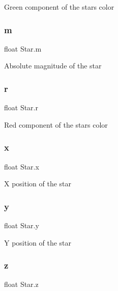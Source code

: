 Green component of the star\textquotesingle{}s color 

\mbox{\label{struct_star_a478e590dc67183b8252670b4e51752d7}} 
\subsubsection{\texorpdfstring{m}{m}}
{\footnotesize\ttfamily float Star.\+m}



Absolute magnitude of the star 

\mbox{\label{struct_star_a8b93e00f216854cad87ac6f61e04b0f3}} 
\subsubsection{\texorpdfstring{r}{r}}
{\footnotesize\ttfamily float Star.\+r}



Red component of the star\textquotesingle{}s color 

\mbox{\label{struct_star_a28e9191b275b9a61792f206185c2a852}} 
\subsubsection{\texorpdfstring{x}{x}}
{\footnotesize\ttfamily float Star.\+x}



X position of the star 

\mbox{\label{struct_star_a5ebda39c55380dcd3586dc32baac647d}} 
\subsubsection{\texorpdfstring{y}{y}}
{\footnotesize\ttfamily float Star.\+y}



Y position of the star 

\mbox{\label{struct_star_a00716c62574f63e932fb031d3d53a9f6}} 
\subsubsection{\texorpdfstring{z}{z}}
{\footnotesize\ttfamily float Star.\+z}



